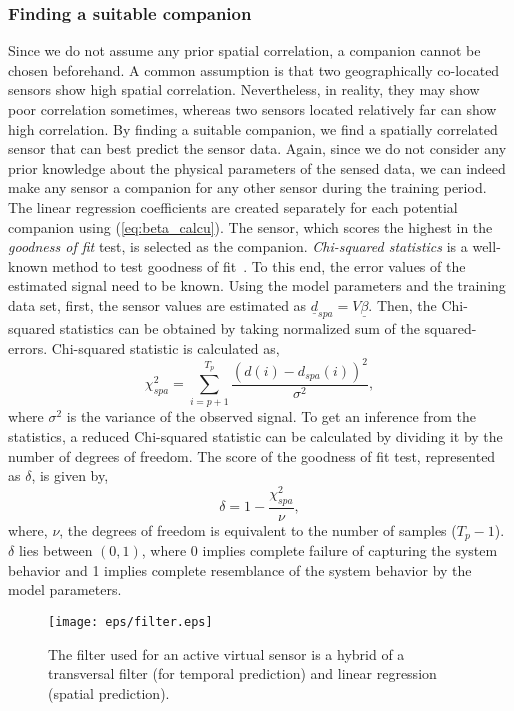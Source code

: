 \documentclass[a4paper,conference]{IEEEtran}
\begin{document}
\subsubsection*{Finding a suitable companion}
Since we do not assume any prior spatial correlation, a companion cannot be chosen beforehand. A common assumption is that two geographically co-located sensors show high spatial correlation. Nevertheless, in reality, they may show poor correlation sometimes, whereas two sensors located relatively far can show high correlation. By finding a suitable companion, we find a spatially correlated sensor that can best predict the sensor data. Again, since we do not consider any prior knowledge about the physical parameters of the sensed data, we can indeed make any sensor a companion for any other sensor during the training period. The linear regression coefficients are created separately for each potential companion using (\ref{eq:beta_calcu}). The sensor, which scores the highest in the {\it goodness of fit} test, is selected as the companion.
{\it Chi-squared statistics} is a well-known method to test goodness of fit~\cite{taylor1997introduction}. To this end, the error values of the estimated signal need to be known. Using the model parameters and the training data set, first, the sensor values are estimated as ${\underline{d}}_{spa} = V\underline{\beta}$. Then, the Chi-squared statistics can be obtained by taking normalized sum of the squared-errors. Chi-squared statistic is calculated as,
\begin{equation}
\chi_{spa}^{2} = \displaystyle\sum_{i=p+1}^{T_{p}}\frac{(d(i) - {d}_{spa}(i))^{2}}{\sigma^{2}}, 
\label{eq:spa}
\end{equation}
where $\sigma^{2}$ is the variance of the observed signal. To get an inference from the statistics, a reduced Chi-squared statistic can be calculated by dividing it by the number of degrees of freedom. The score of the goodness of fit test, represented as $\delta$, is given by, 
\begin{equation}
\delta = 1 - \frac{\chi_{spa}^{2}}{\nu},
\label{eq:del}
\end{equation}
where, $\nu$, the degrees of freedom is equivalent to the number of samples ($T_{p}-1$). $\delta$ lies between $(0, 1)$, where 0 implies complete failure of capturing the system behavior and 1 implies complete resemblance of the system behavior by the model parameters.
\begin{figure}[]
\centering
\texttt{[image: eps/filter.eps]}
\caption{The filter used for an active virtual sensor is a hybrid of a transversal filter (for temporal prediction) and linear regression (spatial prediction).}
\label{fig:filter}
\end{figure}
\end{document}
